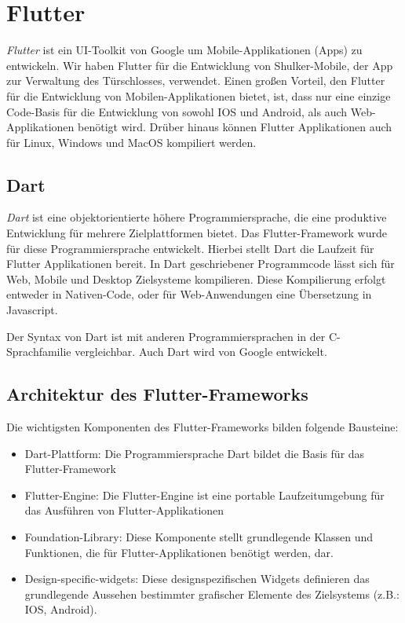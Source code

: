 \section{Flutter}
\label{flutter}
\textit{Flutter} ist ein UI-Toolkit von Google um Mobile-Applikationen (Apps) zu entwickeln.
Wir haben Flutter für die Entwicklung von Shulker-Mobile, der App zur Verwaltung des Türschlosses, verwendet.
Einen großen Vorteil, den Flutter für die Entwicklung von Mobilen-Applikationen bietet, ist, 
dass nur eine einzige Code-Basis für die Entwicklung von sowohl IOS und Android, als auch Web-Applikationen benötigt wird.
Drüber hinaus können Flutter Applikationen auch für Linux, Windows und MacOS kompiliert werden. 
\cite{flutterwikipediaEN}

\subsection{Dart}
\textit{Dart} ist eine objektorientierte höhere Programmiersprache, die eine produktive Entwicklung für
mehrere Zielplattformen bietet. Das Flutter-Framework wurde für diese Programmiersprache entwickelt.
Hierbei stellt Dart die Laufzeit für Flutter Applikationen bereit.
In Dart geschriebener Programmcode lässt sich für Web, Mobile und Desktop Zielsysteme kompilieren. 
Diese Kompilierung erfolgt entweder in Nativen-Code, oder für Web-Anwendungen eine Übersetzung in Javascript.

Der Syntax von Dart ist mit anderen Programmiersprachen in der C-Sprachfamilie vergleichbar.
Auch Dart wird von Google entwickelt.
\cite{dartwikipedia}

\subsection{Architektur des Flutter-Frameworks}
Die wichtigsten Komponenten des Flutter-Frameworks bilden folgende Bausteine: \cite{flutterwikipediaEN}
\begin{itemize}
    \item Dart-Plattform: Die Programmiersprache Dart bildet die Basis für das Flutter-Framework
    \item Flutter-Engine: Die Flutter-Engine ist eine portable Laufzeitumgebung für das Ausführen von Flutter-Applikationen
    \item Foundation-Library: Diese Komponente stellt grundlegende Klassen und Funktionen, die für 
    Flutter-Applikationen benötigt werden, dar.
    \item Design-specific-widgets: Diese designspezifischen Widgets definieren das grundlegende Aussehen
    bestimmter grafischer Elemente des Zielsystems (z.B.: IOS, Android).
\end{itemize}

